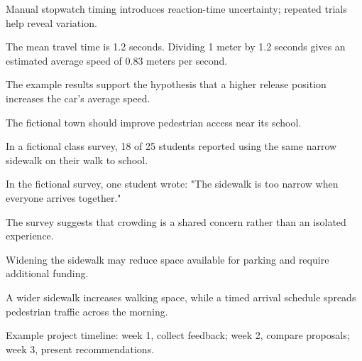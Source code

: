 \documentclass[11pt]{article}
\begin{document}
\begin{uncertaintybox}
Manual stopwatch timing introduces reaction-time uncertainty; repeated trials help reveal variation.
\end{uncertaintybox}

\begin{analysisbox}
The mean travel time is 1.2 seconds. Dividing 1 meter by 1.2 seconds gives an estimated average speed of 0.83 meters per second.
\end{analysisbox}

\begin{conclusionbox}
The example results support the hypothesis that a higher release position increases the car's average speed.
\end{conclusionbox}

\begin{claimbox}
The fictional town should improve pedestrian access near its school.
\end{claimbox}

\begin{evidencebox}
In a fictional class survey, 18 of 25 students reported using the same narrow sidewalk on their walk to school.
\end{evidencebox}

\begin{quotationbox}
In the fictional survey, one student wrote: "The sidewalk is too narrow when everyone arrives together."
\end{quotationbox}

\begin{interpretationbox}
The survey suggests that crowding is a shared concern rather than an isolated experience.
\end{interpretationbox}

\begin{counterargumentbox}
Widening the sidewalk may reduce space available for parking and require additional funding.
\end{counterargumentbox}

\begin{comparisonbox}
A wider sidewalk increases walking space, while a timed arrival schedule spreads pedestrian traffic across the morning.
\end{comparisonbox}

\begin{timelinebox}
Example project timeline: week 1, collect feedback; week 2, compare proposals; week 3, present recommendations.
\end{timelinebox}
\end{document}
